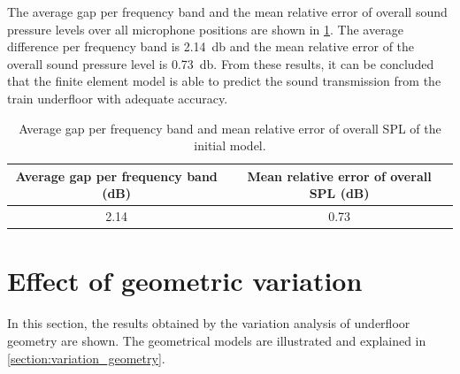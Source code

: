 The average gap per frequency band and the mean relative error of overall sound pressure levels over all microphone positions are shown in \cref{tab:average_gap}.
The average difference per frequency band is \SI{2.14}{\decibel} and the mean relative error of the overall sound pressure level is \SI{0.73}{\decibel}. From these results, it can be concluded that the finite element model is able to predict the sound transmission from the train underfloor with adequate accuracy.

\begin{table}%
	\centering
	\caption{Average gap per frequency band and mean relative error of overall SPL of the initial model.}
	\begin{tabular}{cc}
		\toprule
		Average gap per  frequency band (dB) & Mean relative error of overall SPL (dB) \\
		\midrule
		2.14 & 0.73 \\
		\bottomrule
	\end{tabular}
	\label{tab:average_gap}
\end{table}


\section{Effect of geometric variation}

In this section, the results obtained by the variation analysis of underfloor geometry are shown. The geometrical models are illustrated and explained in \cref{section:variation_geometry}.


